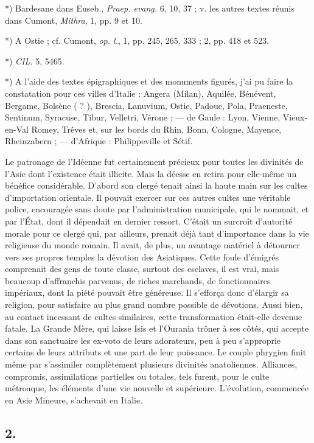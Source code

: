 \documentclass[a4paper, 11pt, oneside, polutonikogreek, french]{article}
\begin{document}
*) Bardesane dans Euseb., \emph{Praep. evang.} 6, 10, 37 ; v. les autres textes réunis dans Cumont, \emph{Mithra}, 1, pp. 9 et 10.

*) A Ostie ; cf. Cumont, \emph{op. l.}, 1, pp. 245, 265, 333 ; 2, pp. 418 et 523.

*) \emph{CIL.} 5, 5465.

*) A l'aide des textes épigraphiques et des monuments figurés, j'ai pu faire la constatation pour ces villes d'Italie : Angera (Milan), Aquilée, Bénévent, Bergame, Bolsène ( ? ), Brescia, Lanuvium, Ostie, Padoue, Pola, Praeneste, Sentinum, Syracuse, Tibur, Velletri, Vérone ; --- de Gaule : Lyon, Vienne, Vieux-en-Val Romey, Trêves et, sur les bords du Rhin, Bonn, Cologne, Mayence, Rheinzabern ; --- d'Afrique : Philippeville et Sétif.

Le patronage de l'Idéenne fut certainement précieux pour toutes les divinités de l'Asie dont l'existence était illicite. Mais la déesse en retira pour elle-même un bénéfice considérable. D'abord son clergé tenait ainsi la haute main sur les cultes d'importation orientale. Il pouvait exercer sur ces autres cultes une véritable police, encouragée sans doute par l'administration municipale, qui le nommait, et par l'État, dont il dépendait en dernier ressort. C'était un surcroît d'autorité morale pour ce clergé qui, par ailleurs, prenait déjà tant d'importance dans la vie religieuse du monde romain. Il avait, de plus, un avantage matériel à détourner vers ses propres temples la dévotion des Asiatiques. Cette foule d'émigrés comprenait des gens de toute classe, surtout des esclaves, il est vrai, mais beaucoup d'affranchis parvenus, de riches marchands, de fonctionnaires impériaux, dont la piété pouvait être généreuse. Il s'efforça donc d'élargir sa religion, pour satisfaire au plus grand nombre possible de dévotions. Aussi bien, au contact incessant de cultes similaires, cette transformation était-elle devenue fatale. La Grande Mère, qui laisse Isis et l'Ourania trôner à ses côtés, qui accepte dans son sanctuaire les ex-voto de leurs adorateurs, peu à peu s'approprie certains de leurs attributs et une part de leur puissance. Le couple phrygien finit même par s'assimiler complètement plusieurs divinités anatoliennes. Alliances, compromis, assimilations partielles ou totales, tels furent, pour le culte métroaque, les éléments d'une vie nouvelle et supérieure. L'évolution, commencée en Asie Mineure, s'achevait en Italie.

\subsection{2.}
\end{document}
